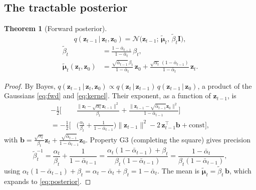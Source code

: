 \documentclass[12pt,a4paper]{article}
\theoremstyle{definition}
\theoremstyle{plain}
\newtheorem{theorem}{Theorem}
\newcommand{\N}{\mathcal{N}}
\newcommand{\z}{\bm{z}}
\newcommand{\II}{\mathbf{I}}
\newcommand{\abar}{\bar{\alpha}}
\newcommand{\given}{\,\vert\,}
\begin{document}
\subsection{The tractable posterior}
\begin{theorem}[Forward posterior]\label{thm:posterior}
\begin{equation}
q(\z_{t-1}\given\z_t,\z_0)=\N\!\big(\z_{t-1};\,\tilde{\bm\mu}_t,\,\tilde\beta_t\II\big),
\end{equation}
\begin{align}
\tilde\beta_t&=\frac{1-\abar_{t-1}}{1-\abar_t}\,\beta_t,\\
\tilde{\bm\mu}_t(\z_t,\z_0)&=
\frac{\sqrt{\abar_{t-1}}\,\beta_t}{1-\abar_t}\,\z_0
+\frac{\sqrt{\alpha_t}\,(1-\abar_{t-1})}{1-\abar_t}\,\z_t.
\label{eq:posterior}
\end{align}
\end{theorem}
\begin{proof}
By Bayes, $q(\z_{t-1}\given\z_t,\z_0)\propto q(\z_t\given\z_{t-1})\,q(\z_{t-1}\given\z_0)$,
a product of the Gaussians \eqref{eq:fwd} and \eqref{eq:kernel}. Their exponent,
as a function of $\z_{t-1}$, is
\begin{align}
-\frac12\Big[&\frac{\|\z_t-\sqrt{\alpha_t}\z_{t-1}\|^2}{\beta_t}
   +\frac{\|\z_{t-1}-\sqrt{\abar_{t-1}}\z_0\|^2}{1-\abar_{t-1}}\Big]\\
=-\frac12\Big[&\Big(\tfrac{\alpha_t}{\beta_t}+\tfrac{1}{1-\abar_{t-1}}\Big)\|\z_{t-1}\|^2
  -2\,\z_{t-1}^\top\bm b +\text{const}\Big],
\end{align}
with $\bm b=\frac{\sqrt{\alpha_t}}{\beta_t}\z_t+\frac{\sqrt{\abar_{t-1}}}{1-\abar_{t-1}}\z_0$.
Property G3 (completing the square) gives precision
\begin{equation}
\tilde\beta_t^{-1}=\frac{\alpha_t}{\beta_t}+\frac{1}{1-\abar_{t-1}}
=\frac{\alpha_t(1-\abar_{t-1})+\beta_t}{\beta_t(1-\abar_{t-1})}
=\frac{1-\abar_t}{\beta_t(1-\abar_{t-1})},
\end{equation}
using $\alpha_t(1-\abar_{t-1})+\beta_t=\alpha_t-\abar_t+\beta_t=1-\abar_t$. The mean
is $\tilde{\bm\mu}_t=\tilde\beta_t\,\bm b$, which expands to \eqref{eq:posterior}.
\end{proof}
\end{document}
